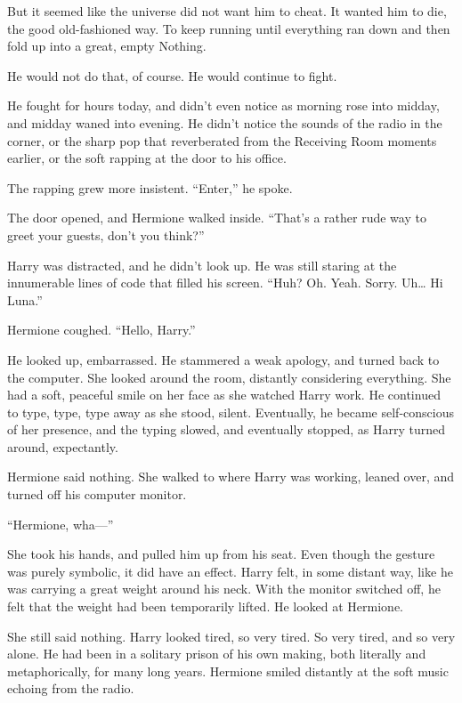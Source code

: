 But it seemed like the universe did not want him to cheat. It wanted him to die, the good old-fashioned way. To keep running until everything ran down and then fold up into a great, empty Nothing.

He would not do that, of course. He would continue to fight.

He fought for hours today, and didn’t even notice as morning rose into midday, and midday waned into evening. He didn’t notice the sounds of the radio in the corner, or the sharp pop that reverberated from the Receiving Room moments earlier, or the soft rapping at the door to his office.


The rapping grew more insistent. “Enter,” he spoke.

The door opened, and Hermione walked inside. “That’s a rather rude way to greet your guests, don’t you think?”

Harry was distracted, and he didn’t look up. He was still staring at the innumerable lines of code that filled his screen. “Huh? Oh. Yeah. Sorry. Uh… Hi Luna.”

Hermione coughed. “Hello, Harry.”

He looked up, embarrassed. He stammered a weak apology, and turned back to the computer. She looked around the room, distantly considering everything. She had a soft, peaceful smile on her face as she watched Harry work. He continued to type, type, type away as she stood, silent. Eventually, he became self-conscious of her presence, and the typing slowed, and eventually stopped, as Harry turned around, expectantly.

Hermione said nothing. She walked to where Harry was working, leaned over, and turned off his computer monitor.

“Hermione, wha\mbox{---}”

She took his hands, and pulled him up from his seat. Even though the gesture was purely symbolic, it did have an effect. Harry felt, in some distant way, like he was carrying a great weight around his neck. With the monitor switched off, he felt that the weight had been temporarily lifted. He looked at Hermione.

She still said nothing. Harry looked tired, so very tired. So very tired, and so very alone. He had been in a solitary prison of his own making, both literally and metaphorically, for many long years. Hermione smiled distantly at the soft music echoing from the radio.

